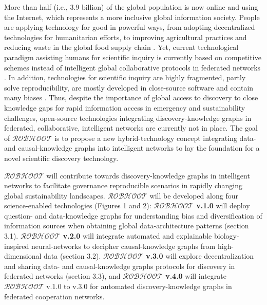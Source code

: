 \documentclass[11pt, a4paper]{article} %
\begin{document}
More than half (i.e., 3.9 billion) of the global population is now
online and using the Internet, which represents a more inclusive
global information society. People are applying technology for good in
powerful ways, from adopting decentralized technologies for
humanitarian efforts, to improving agricultural practices and reducing
waste in the global food supply chain \citep{Wilson2018}. Yet, current
technological paradigm assisting humans for scientific inquiry is
currently based on competitive schemes instead of intelligent global
collaborative protocols in federated networks \citep{Dilley2016}. In
addition, technologies for scientific inquiry are highly fragmented,
partly solve reproducibility, are mostly developed in close-source
software and contain many biases
\citep{Inhaber1977,Ioannidis2005,Fang2011,Gunther2018,Hardwicke2018,Mehrabi2019,Real2020}. Thus,
despite the importance of global access to discovery to close
knowledge gaps for rapid information access in emergency and
sustainability challenges, open-source technologies integrating
discovery-knowledge graphs in federated, collaborative, intelligent
networks are currently not in place. The goal of $\mathcal{ROBHOOT}$
is to propose a new hybrid-technology concept integrating data- and
causal-knowledge graphs into intelligent networks to lay the
foundation for a novel scientific discovery technology.

$\mathcal{ROBHOOT}$ will contribute towards discovery-knowledge graphs
in intelligent networks to facilitate governance reproducible
scenarios in rapidly changing global sustainability
landscapes. $\mathcal{ROBHOOT}$ will be developed along four
science-enabled technologies (Figures 1 and 2): {\bf
  $\mathcal{ROBHOOT}$ v.1.0} will deploy question- and data-knowledge
graphs for understanding bias and diversification of information
sources when obtaining global data-architecture patterns (section
3.1). {\bf $\mathcal{ROBHOOT}$ v.2.0} will integrate automated and
explainable biology-inspired neural-networks to decipher
causal-knowledge graphs from high-dimensional data (section 3.2). {\bf
  $\mathcal{ROBHOOT}$ v.3.0} will explore decentralization and sharing
data- and causal-knowledge graphs protocols for discovery in federated
networks (section 3.3), and {\bf $\mathcal{ROBHOOT}$ v.4.0} will
integrate $\mathcal{ROBHOOT}$ v.1.0 to v.3.0 for automated
discovery-knowledge graphs in federated cooperation networks.
\end{document}
